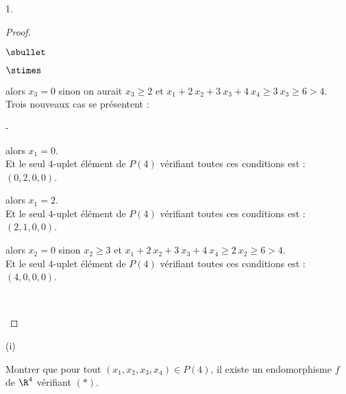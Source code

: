 \documentclass[11pt]{article}%
\begin{document}
\begin{noliste}{1.}
\begin{proof}
\begin{noliste}{$\sbullet$}
\begin{noliste}{$\stimes$}
        \item {} alors $x_3 = 0$ sinon on
          aurait $x_3 \geq 2$ et $x_1 + 2 \ x_2 + 3 \ x_3 + 4 \ x_4 
          \geq 3 \ x_3 \geq 6 > 4$.\\
          Trois nouveaux cas se présentent :
          \begin{noliste}{-}
          \item {} alors $x_1 = 0$.\\
            Et le seul $4$-uplet élément de $P(4)$ vérifiant toutes
            ces conditions est : $(0, 2, 0, 0)$.
          \item {} alors $x_1 = 2$.\\
            Et le seul $4$-uplet élément de $P(4)$ vérifiant toutes
            ces conditions est : $(2, 1, 0, 0)$.
          \item {} alors $x_2 = 0$
            sinon $x_2 \geq 3$ et $x_1 + 2 \ x_2 + 3 \ x_3 +
            4 \ x_4 \geq 2 \ x_2 \geq 6 > 4$.\\
            Et le seul $4$-uplet élément de $P(4)$ vérifiant toutes
            ces conditions est : $(4, 0, 0, 0)$.            
          \end{noliste}          
        \end{noliste}
        ~\\[-1.4cm] 
      \end{noliste}
    \end{proof}




    \begin{noliste}{(i)}
      \setcounter{enumii}{2}
    \item Montrer que pour tout $(x_1,x_2,x_3,x_4) \in P(4)$, il
      existe un endomorphisme $f$ de $\R^4$ vérifiant \nolinebreak
      $(*)$.


\end{noliste}
\end{noliste}
\end{document}
